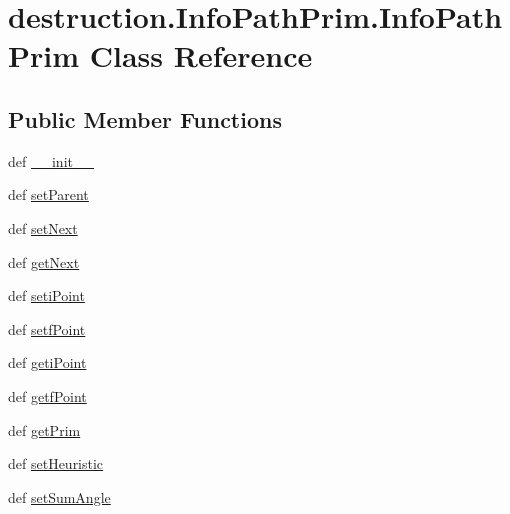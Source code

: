 \hypertarget{classdestruction_1_1_info_path_prim_1_1_info_path_prim}{\section{destruction.\-Info\-Path\-Prim.\-Info\-Path\-Prim Class Reference}
\label{classdestruction_1_1_info_path_prim_1_1_info_path_prim}
}
\subsection*{Public Member Functions}
\begin{DoxyCompactItemize}
\item 
def \hyperlink{classdestruction_1_1_info_path_prim_1_1_info_path_prim_afe572080227357b120905def1beb3e4b}{\-\_\-\-\_\-init\-\_\-\-\_\-}
\item 
def \hyperlink{classdestruction_1_1_info_path_prim_1_1_info_path_prim_a751e3d9e873c06a85f9747649161cddb}{set\-Parent}
\item 
def \hyperlink{classdestruction_1_1_info_path_prim_1_1_info_path_prim_ac3221a6620a8c62bc25cea680e7919e8}{set\-Next}
\item 
def \hyperlink{classdestruction_1_1_info_path_prim_1_1_info_path_prim_a1500ab2e5c1b5177379aef5833b7ac7f}{get\-Next}
\item 
def \hyperlink{classdestruction_1_1_info_path_prim_1_1_info_path_prim_aa916f3403081ed453f13e6c96b3e54ad}{seti\-Point}
\item 
def \hyperlink{classdestruction_1_1_info_path_prim_1_1_info_path_prim_adec24febe0872df5c09e68f1ee17595a}{setf\-Point}
\item 
def \hyperlink{classdestruction_1_1_info_path_prim_1_1_info_path_prim_a9c41b4a5e7bf052a76637278c5f633ca}{geti\-Point}
\item 
def \hyperlink{classdestruction_1_1_info_path_prim_1_1_info_path_prim_a5a98c86606c747d45cf176b4a1fe26e7}{getf\-Point}
\item 
def \hyperlink{classdestruction_1_1_info_path_prim_1_1_info_path_prim_a6fafd65ba1219559314bd5fc9f564748}{get\-Prim}
\item 
def \hyperlink{classdestruction_1_1_info_path_prim_1_1_info_path_prim_ad4056d4e1c180a22c71fd5e78102cc27}{set\-Heuristic}
\item 
def \hyperlink{classdestruction_1_1_info_path_prim_1_1_info_path_prim_a3161a1f8485e65731d152b79ca1cc5a7}{set\-Sum\-Angle}
\end{DoxyCompactItemize}

